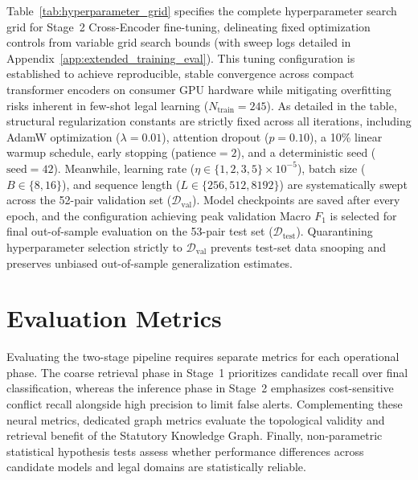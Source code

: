         Table~\ref{tab:hyperparameter_grid} specifies the complete hyperparameter search grid for Stage~2 Cross-Encoder fine-tuning, delineating fixed optimization controls from variable grid search bounds (with sweep logs detailed in Appendix~\ref{app:extended_training_eval}). This tuning configuration is established to achieve reproducible, stable convergence across compact transformer encoders on consumer GPU hardware while mitigating overfitting risks inherent in few-shot legal learning ($N_{\text{train}} = 245$). As detailed in the table, structural regularization constants are strictly fixed across all iterations, including AdamW optimization ($\lambda = 0.01$), attention dropout ($p = 0.10$), a 10\% linear warmup schedule, early stopping ($\text{patience} = 2$), and a deterministic seed ($\text{seed} = 42$). Meanwhile, learning rate ($\eta \in \{1, 2, 3, 5\} \times 10^{-5}$), batch size ($B \in \{8, 16\}$), and sequence length ($L \in \{256, 512, 8192\}$) are systematically swept across the 52-pair validation set ($\mathcal{D}_{\text{val}}$). Model checkpoints are saved after every epoch, and the configuration achieving peak validation Macro $F_1$ is selected for final out-of-sample evaluation on the 53-pair test set ($\mathcal{D}_{\text{test}}$). Quarantining hyperparameter selection strictly to $\mathcal{D}_{\text{val}}$ prevents test-set data snooping and preserves unbiased out-of-sample generalization estimates.

    \section{Evaluation Metrics}
    \label{sec:evaluation_metrics}
    Evaluating the two-stage pipeline requires separate metrics for each operational phase. The coarse retrieval phase in Stage~1 prioritizes candidate recall over final classification, whereas the inference phase in Stage~2 emphasizes cost-sensitive conflict recall alongside high precision to limit false alerts. Complementing these neural metrics, dedicated graph metrics evaluate the topological validity and retrieval benefit of the Statutory Knowledge Graph. Finally, non-parametric statistical hypothesis tests assess whether performance differences across candidate models and legal domains are statistically reliable.

